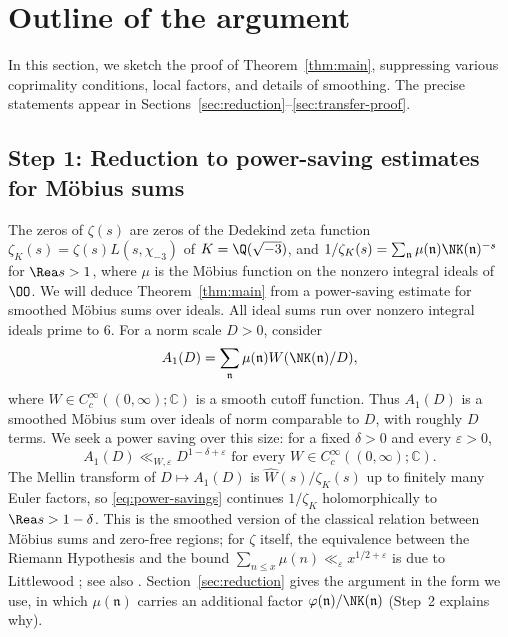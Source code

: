 \section{Outline of the argument}\label{sec:outline}

In this section, we sketch the proof of Theorem~\ref{thm:main}, suppressing
various coprimality conditions, local factors, and details of smoothing.
The precise statements appear in Sections~\ref{sec:reduction}--\ref{sec:transfer-proof}.

\subsection{Step 1: Reduction to power-saving estimates for M\"obius sums}

The zeros of $\zeta(s)$ are zeros of the Dedekind zeta function
$\zeta_K(s)=\zeta(s)L(s,\chi_{-3})$ of $K=\Q(\sqrt{-3})$, and
$1/\zeta_K(s)=\sum_{\mathfrak n}\mu(\mathfrak n)\NK(\mathfrak n)^{-s}$ for $\Rea s>1$, where
$\mu$ is the M\"obius function on the nonzero integral ideals of $\OO$. We will deduce
Theorem~\ref{thm:main} from a power-saving estimate for smoothed M\"obius sums over ideals.
All ideal sums run over nonzero integral ideals prime to $6$. For a norm scale $D>0$,
consider
\[
 A_1(D)=\sum_{\mathfrak n}
   \mu(\mathfrak n)W(\NK(\mathfrak n)/D),
\]
where $W\in C_c^\infty((0,\infty);\mathbb C)$ is a smooth cutoff function. Thus $A_1(D)$ is a
smoothed M\"obius sum over ideals of norm comparable to $D$, with roughly $D$ terms. We seek a
power saving over this size: for a fixed $\delta>0$ and every $\varepsilon>0$,
\begin{equation}\label{eq:power-savings}
A_1(D)\ll_{W,\varepsilon}D^{1-\delta+\varepsilon} \text{ for every }W\in C_c^\infty((0,\infty);\mathbb C).
\end{equation}
The Mellin transform of $D\mapsto A_1(D)$ is $\widehat W(s)/\zeta_K(s)$ up to finitely many
Euler factors, so \eqref{eq:power-savings} continues $1/\zeta_K$ holomorphically to
$\Rea s>1-\delta$. This is the smoothed version of the classical relation between M\"obius
sums and zero-free regions; for $\zeta$ itself, the equivalence between the Riemann Hypothesis
and the bound $\sum_{n\le x}\mu(n)\ll_\varepsilon x^{1/2+\varepsilon}$ is due to Littlewood
\cite{Lit12}; see also \cite[\S1]{MM09}. Section~\ref{sec:reduction} gives the argument in
the form we use, in which $\mu(\mathfrak n)$ carries an additional factor
$\varphi(\mathfrak n)/\NK(\mathfrak n)$ (Step~2 explains why).

